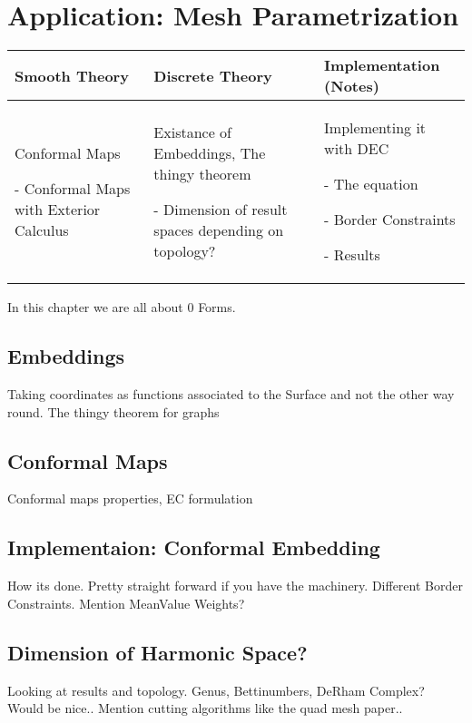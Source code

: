 \documentclass[]{scrbook}
\newenvironment{packed_enum}{
\begin{enumerate}
  \setlength{\itemsep}{1pt}
  \setlength{\parskip}{0pt}
  \setlength{\parsep}{0pt}
}{\end{enumerate}}
\begin{document}
\section{Application: Mesh Parametrization}
	\begin{longtable}{|p{4.5cm}|p{4.5cm}|p{4.5cm}|}
		\hline
		Smooth Theory& Discrete Theory& Implementation (Notes)\\
		\hline
			Conformal Maps
			\begin{packed_enum}
				\item[-] Conformal Maps with Exterior Calculus
			\end{packed_enum}
			&
			Existance of Embeddings, The thingy theorem
			\begin{packed_enum}
				\item[-] Dimension of result spaces depending on topology?
			\end{packed_enum}
			 & 
			 Implementing it with DEC
			 \begin{packed_enum}
				\item[-] The equation
				\item[-] Border Constraints
				\item[-] Results
			\end{packed_enum}
			 \\		
		\hline
	\end{longtable}
	In this chapter we are all about 0 Forms.
	\subsection{Embeddings}
	Taking coordinates as functions associated to the Surface and not the other way round. The thingy theorem for graphs
	\subsection{Conformal Maps}
	Conformal maps properties, EC formulation
	\subsection{Implementaion: Conformal Embedding}
		How its done. Pretty straight forward if you have the machinery. Different Border Constraints. Mention MeanValue Weights?
	\subsection{Dimension of Harmonic Space?}
		Looking at results and topology. Genus, Bettinumbers, DeRham Complex?	Would be nice..
		Mention cutting algorithms like the quad mesh paper..
\newpage	
\end{document}
